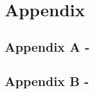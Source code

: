 

\chapter*{Appendix} \label{appendix}

\section*{Appendix A - } \label{appA:}

\section*{Appendix B - } \label{appB:}

